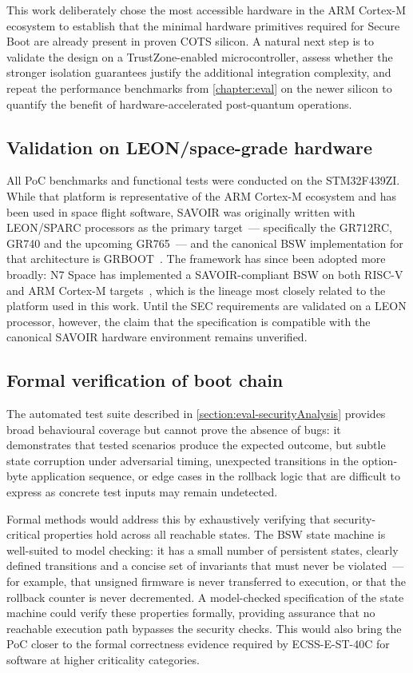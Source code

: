 This work deliberately chose the most accessible hardware in the ARM Cortex-M ecosystem to establish that the minimal hardware primitives required for Secure Boot are already present in proven COTS silicon. A natural next step is to validate the design on a TrustZone-enabled microcontroller, assess whether the stronger isolation guarantees justify the additional integration complexity, and repeat the performance benchmarks from \autoref{chapter:eval} on the newer silicon to quantify the benefit of hardware-accelerated post-quantum operations.

\subsection{Validation on LEON/space-grade hardware}
\label{subsection:conclusion-futureWork-LEON}

All PoC benchmarks and functional tests were conducted on the STM32F439ZI. While that platform is representative of the ARM Cortex-M ecosystem and has been used in space flight software, SAVOIR was originally written with LEON/SPARC processors as the primary target~--- specifically the GR712RC, GR740 and the upcoming GR765~--- and the canonical BSW implementation for that architecture is GRBOOT~\cite{GRBOOT}. The framework has since been adopted more broadly: N7 Space has implemented a SAVOIR-compliant BSW on both RISC-V and ARM Cortex-M targets~\cite{N7-Space-BSW}, which is the lineage most closely related to the platform used in this work. Until the SEC requirements are validated on a LEON processor, however, the claim that the specification is compatible with the canonical SAVOIR hardware environment remains unverified.

\subsection{Formal verification of boot chain}
\label{subsection:conclusion-futureWork-formalVerification}

The automated test suite described in \autoref{section:eval-securityAnalysis} provides broad behavioural coverage but cannot prove the absence of bugs: it demonstrates that tested scenarios produce the expected outcome, but subtle state corruption under adversarial timing, unexpected transitions in the option-byte application sequence, or edge cases in the rollback logic that are difficult to express as concrete test inputs may remain undetected.

Formal methods would address this by exhaustively verifying that security-critical properties hold across all reachable states. The BSW state machine is well-suited to model checking: it has a small number of persistent states, clearly defined transitions and a concise set of invariants that must never be violated~--- for example, that unsigned firmware is never transferred to execution, or that the rollback counter is never decremented. A model-checked specification of the state machine could verify these properties formally, providing assurance that no reachable execution path bypasses the security checks. This would also bring the PoC closer to the formal correctness evidence required by ECSS-E-ST-40C for software at higher criticality categories.

